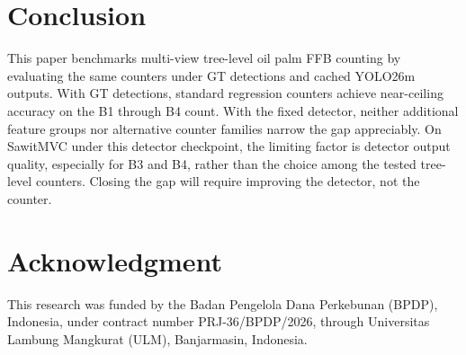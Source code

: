 ﻿\documentclass[conference]{IEEEtran}
\begin{document}
\section{Conclusion}

This paper benchmarks multi-view tree-level oil palm FFB counting by evaluating
the same counters under GT detections and cached YOLO26m outputs. With GT
detections, standard regression counters achieve near-ceiling accuracy on the
B1 through B4 count. With the fixed detector, neither additional feature groups
nor alternative counter families narrow the gap appreciably. On SawitMVC under
this detector checkpoint, the limiting factor is detector output quality,
especially for B3 and B4, rather than the choice among the tested tree-level
counters. Closing the gap will require improving the detector, not the counter.

\section*{Acknowledgment}

This research was funded by the Badan Pengelola Dana Perkebunan (BPDP),
Indonesia, under contract number PRJ-36/BPDP/2026, through Universitas Lambung
Mangkurat (ULM), Banjarmasin, Indonesia.
\end{document}

